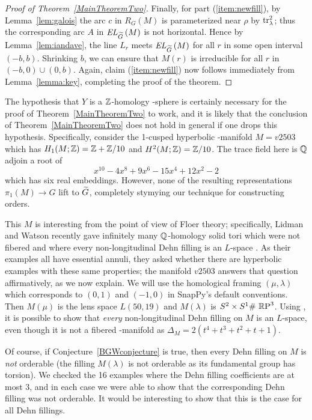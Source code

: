 \documentclass[tikz, sepfignums, defaultenums]{nmd/article}
\newcommand{\RG}[1]{\mathit{R}_{G}\left(#1\right)}
\newcommand{\TEL}[1]{\mathit{EL}_\Gtil\left(#1\right)}
\begin{document}
\begin{proof}[Proof of Theorem~\ref{MainTheoremTwo}]
Finally, for part (\ref{item:newfill}), by Lemma~\ref{lem:galois} the
arc $c$ in $\RG{M}$ is parameterized near $\rho$ by $\operatorname{tr}_\lambda^2$;
thus the corresponding arc $A$ in $\TEL{M}$ is not horizontal.  Hence
by Lemma~\ref{lem:iandave}, the line $L_r$ meets $\TEL{M}$ for all $r$
in some open interval $(-b, b)$.  Shrinking $b$, we can ensure that
$M(r)$ is irreducible for all $r$ in $(-b, 0) \cup (0, b)$.  Again, 
claim (\ref{item:newfill}) now follows immediately from
Lemma~\ref{lemma:key}, completing the proof of the theorem. 
\end{proof}

\begin{remark}
  \label{rem:allL}
  The hypothesis that $Y$ is a ${\mathbb Z}$-homology \3-sphere is certainly
  necessary for the proof of Theorem~\ref{MainTheoremTwo} to work, and
  it is likely that the conclusion of Theorem~\ref{MainTheoremTwo}
  does not hold in general if one drops this hypothesis.
  Specifically, consider the 1-cusped hyperbolic \3-manifold
  $M = v2503$ which has $H_1(M; {\mathbb Z}) = {\mathbb Z} + {\mathbb Z}/10$ and
  $H^2(M; {\mathbb Z}) = {\mathbb Z}/10$. The trace field here is ${\mathbb Q}$ adjoin a root of
  \[
  x^{10} - 4 x^{8} + 9 x^{6} - 15 x^{4} + 12 x^{2} - 2
  \]
  which has six real embeddings.  However, none of the resulting
  representations $\pi_1(M) \to G$ lift to $\Gtil$, completely
  stymying our technique for constructing orders.

  This $M$ is interesting from the point of view of Floer theory;
  specifically, Lidman and Watson recently gave infinitely many
  ${\mathbb Q}$-homology solid tori which were not fibered and where every
  non-longitudinal Dehn filling is an $L$-space
  \cite{LidmanWatson2014}.  As their examples all have essential
  annuli, they asked \cite[Question 6]{LidmanWatson2014} whether there
  are hyperbolic examples with these same properties; the manifold
  $v2503$ answers that question affirmatively, as we now explain.  We
  will use the homological framing $(\mu, \lambda)$ which corresponds
  to $(0, 1)$ and $(-1, 0)$ in SnapPy's default conventions.  Then
  $M(\mu)$ is the lens space $L(50, 19)$ and $M(\lambda)$ is
  $S^2 \times S^1 \#\ {{\mathbb{R}}\mathrm{P}}^{3}$.  Using \cite{RasmussenRasmussen2015},
  it is possible to show that \emph{every} non-longitudinal Dehn
  filling on $M$ is an $L$-space, even though it is not a fibered
  \3-manifold as $\Delta_M = 2(t^{4} + t^{3} + t^{2} + t + 1)$.

  Of course, if Conjecture~\ref{BGWconjecture} is true, then every
  Dehn filling on $M$ is \emph{not} orderable (the filling
  $M(\lambda)$ is not orderable as its fundamental group has torsion).
  We checked the 16 examples where the Dehn filling coefficients are at
  most 3, and in each case we were able to show that the corresponding
  Dehn filling was not orderable.  It would be interesting to show
  that this is the case for all Dehn fillings.  
\end{remark}
\end{document}
